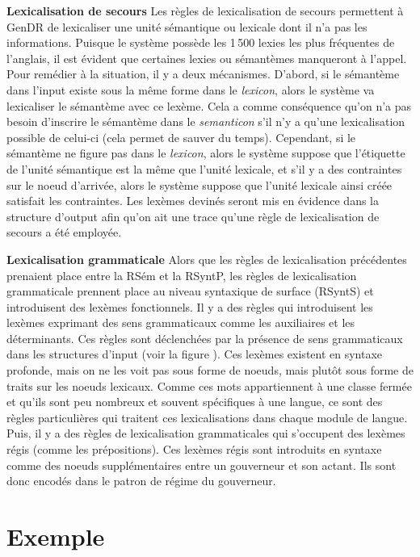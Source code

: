 \textbf{Lexicalisation de secours}
Les règles de lexicalisation de secours permettent à GenDR de lexicaliser une unité sémantique ou lexicale dont il n'a pas les informations. Puisque le système possède les 1\,500 lexies les plus fréquentes de l'anglais, il est évident que certaines lexies ou sémantèmes manqueront à l'appel. Pour remédier à la situation, il y a deux mécanismes. D'abord, si le sémantème dans l'input existe sous la même forme dans le \emph{lexicon}, alors le système va lexicaliser le sémantème avec ce lexème. Cela a comme conséquence qu'on n'a pas besoin d'inscrire le sémantème dans le \emph{semanticon} s'il n'y a qu'une lexicalisation possible de celui-ci (cela permet de sauver du temps). Cependant, si le sémantème ne figure pas dans le \emph{lexicon}, alors le système suppose que l'étiquette de l'unité sémantique est la même que l'unité lexicale, et s'il y a des contraintes sur le noeud d'arrivée, alors le système suppose que l'unité lexicale ainsi créée satisfait les contraintes. Les lexèmes devinés seront mis en évidence dans la structure d'output afin qu'on ait une trace qu'une règle de lexicalisation de secours a été employée.

	
\textbf{Lexicalisation grammaticale}
Alors que les règles de lexicalisation précédentes prenaient place entre la RSém et la RSyntP, les règles de lexicalisation grammaticale prennent place au niveau syntaxique de surface (RSyntS) et introduisent des lexèmes fonctionnels. Il y a des règles qui introduisent les lexèmes exprimant des sens grammaticaux comme les auxiliaires et les déterminants. Ces règles sont déclenchées par la présence de sens grammaticaux dans les structures d'input (voir la figure ). Ces lexèmes existent en syntaxe profonde, mais on ne les voit pas sous forme de noeuds, mais plutôt sous forme de traits sur les noeuds lexicaux. Comme ces mots appartiennent à une classe fermée et qu'ils sont peu nombreux et souvent spécifiques à une langue, ce sont des règles particulières qui traitent ces lexicalisations dans chaque module de langue. Puis, il y a des règles de lexicalisation grammaticales qui s'occupent des lexèmes régis (comme les prépositions). Ces lexèmes régis sont introduits en syntaxe comme des noeuds supplémentaires entre un gouverneur et son actant. Ils sont donc encodés dans le patron de régime du gouverneur.


\section{Exemple}\label{secexemple}

